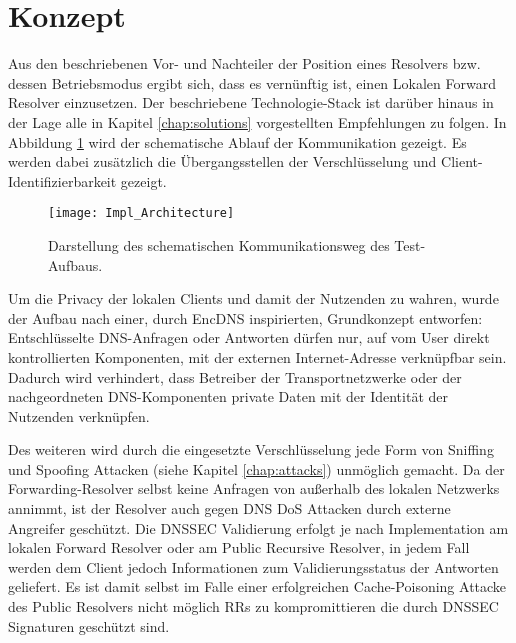 \section{Konzept}
Aus den beschriebenen Vor- und Nachteiler der Position eines Resolvers bzw. dessen Betriebsmodus ergibt sich, dass es vernünftig ist, einen Lokalen Forward Resolver einzusetzen. Der beschriebene Technologie-Stack ist darüber hinaus in der Lage alle in Kapitel \ref{chap:solutions} vorgestellten Empfehlungen zu folgen. In Abbildung \ref{img:impl-architecture} wird der schematische Ablauf der Kommunikation gezeigt. Es werden dabei zusätzlich die Übergangsstellen der Verschlüsselung und Client-Identifizierbarkeit gezeigt.

\begin{figure}[hb]
    \centering
    \texttt{[image: Impl\_Architecture]}
    \caption{Darstellung des schematischen Kommunikationsweg des Test-Aufbaus.}
    \label{img:impl-architecture}
\end{figure}

Um die Privacy der lokalen Clients und damit der Nutzenden zu wahren, wurde der Aufbau nach einer, durch EncDNS \cite{Herrmann2014} inspirierten, Grundkonzept entworfen: Entschlüsselte DNS-Anfragen oder Antworten dürfen nur, auf vom User direkt kontrollierten Komponenten, mit der externen Internet-Adresse verknüpfbar sein. Dadurch wird verhindert, dass Betreiber der Transportnetzwerke oder der nachgeordneten DNS-Komponenten private Daten mit der Identität der Nutzenden verknüpfen.

Des weiteren wird durch die eingesetzte Verschlüsselung jede Form von Sniffing und Spoofing Attacken (siehe Kapitel \ref{chap:attacks}) unmöglich gemacht. Da der Forwarding-Resolver selbst keine Anfragen von außerhalb des lokalen Netzwerks annimmt, ist der Resolver auch gegen DNS DoS Attacken durch externe Angreifer geschützt. Die DNSSEC Validierung erfolgt je nach Implementation am lokalen Forward Resolver oder am Public Recursive Resolver, in jedem Fall werden dem Client jedoch Informationen zum Validierungsstatus der Antworten geliefert. Es ist damit selbst im Falle einer erfolgreichen Cache-Poisoning Attacke des Public Resolvers nicht möglich RRs zu kompromittieren die durch DNSSEC Signaturen geschützt sind.

